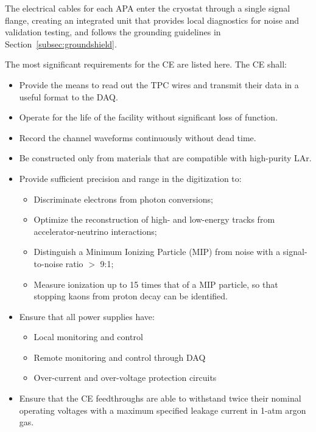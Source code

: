 The electrical cables for each APA enter the cryostat through a single 
signal flange, creating an integrated unit that provides local diagnostics for noise and validation testing,
and follows the grounding guidelines in Section~\ref{subsec:groundshield}.

%

The most significant requirements for the CE are listed here. The CE shall:

\begin{itemize}	
\item Provide the means to read out the TPC wires and transmit their data in a useful format to the DAQ.
\item Operate for the life of the facility without significant loss of function.
\item Record the channel waveforms continuously without dead time.
\item Be constructed only from materials that are compatible with high-purity LAr.
\item Provide sufficient precision and range in the digitization to:
\begin{itemize}
\item Discriminate electrons from photon conversions;
\item Optimize the reconstruction of high- and low-energy tracks from accelerator-neutrino interactions;
\item Distinguish a Minimum Ionizing Particle (MIP) from noise with a signal-to-noise ratio $>$ 9:1;
\item Measure  ionization up to 15 times that of a MIP particle, so that stopping kaons from proton decay can be identified.
\end{itemize}
\item Ensure that all power supplies have: 
\begin{itemize}
\item Local monitoring and control
\item Remote monitoring and control through DAQ
\item Over-current and over-voltage protection circuits
\end{itemize}
\item Ensure that the CE feedthroughs are able to withstand twice their nominal operating voltages 
with a maximum specified leakage current in 1-atm argon gas.
\end{itemize}


